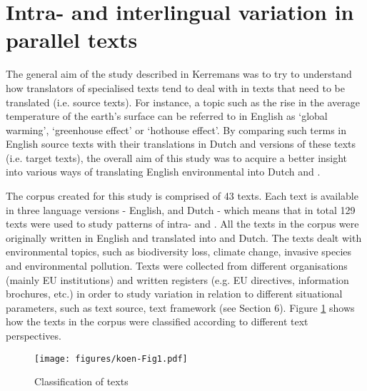 \documentclass[output=paper]{langsci/langscibook.cls}
\begin{document}
\section{Intra- and interlingual variation in parallel texts}\label{sec:3}

The general aim of the study described in Kerremans \citep{2012} was to try to understand 
how translators of specialised texts tend to deal with  
in texts that need to be translated (i.e. source texts). For instance, a topic 
such as the rise in the average temperature of the earth's surface can be referred 
to in English as `global warming', `greenhouse effect' or `hothouse effect'. By 
comparing such terms in English source texts with their translations in Dutch and 
 versions of these texts (i.e. target texts), the overall aim of this study 
was to acquire a better insight into various ways of translating English environmental 
 into Dutch and .

The corpus created for this study is comprised of 43 texts. Each text is available in three language versions - English,  and Dutch - which means that in total 129 texts were used to study patterns of intra- and . All 
the texts in the corpus were originally written in English and translated into  and Dutch. The texts dealt with environmental topics, such as biodiversity loss, climate change, invasive species and environmental pollution. Texts were 
collected from different organisations (mainly EU institutions) and written registers (e.g. EU directives, information brochures, etc.) in order to study variation in relation to different situational parameters, such as text source, text framework 
(see Section 6). Figure \ref{fig:k1} shows how the texts in the corpus were classified according to different text perspectives.

\begin{figure}
\texttt{[image: figures/koen-Fig1.pdf]}
\caption{Classification of texts}
\label{fig:k1}
\end{figure}
\end{document}
